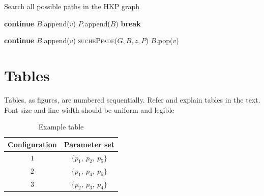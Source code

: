 \begin{algorithm}
  \caption{Search all possible paths in the HKP graph}
    \label{alg:pfadsuche}
  \begin{algorithmic}[1]
    \Statex
       
        
        \State \textbf{continue}
       \EndIf
        
        \State $B$.append($v$) 
        \State $P$.append($B$) 
        \State \textbf{break}
       \EndIf
      \EndFor
      
        
        \State \textbf{continue}        
       \EndIf
       \State $B$.append($v$) 
       \State \textsc{suchePfade}($G,B,z,P$) 
       \State $B$.pop($v$)
      \EndFor
    \EndFunction
  \end{algorithmic}
\end{algorithm}

\section{Tables}
\label{hinweise:tabellen}

Tables, as figures, are numbered sequentially.
Refer and explain tables in the text.
Font size and line width should be uniform and legible

\begin{table}[htbp]
	\caption{Example table}
	\renewcommand{\arraystretch}{1.3}
	\centering
	\begin{tabular}{cc}
		\toprule
		Configuration & Parameter set \\
		\midrule
		$1$ & $\{p_{1}, \: p_{2}, \: p_{5}\}$ \\
		$2$ & $\{p_{1}, \: p_{4}, \: p_{5}\}$ \\
		$3$ & $\{p_{2}, \: p_{3}, \: p_{4}\}$ \\
		\bottomrule
	\end{tabular}
	\label{tab:bsp1}
\end{table}


